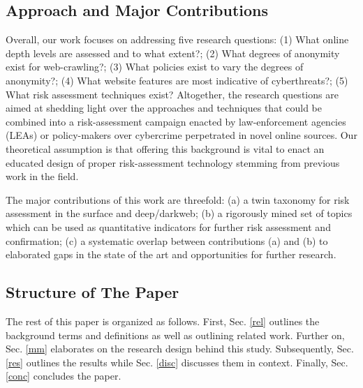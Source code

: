 \subsection{Approach and Major Contributions}
Overall, our work focuses on addressing five research questions: (1) What online depth levels are assessed and to what extent?; (2) What degrees of anonymity exist for web-crawling?; (3) What policies exist to vary the degrees of anonymity?; (4) What website features are most indicative of cyberthreats?; (5) What risk assessment techniques exist? Altogether, the research questions are aimed at shedding light over the approaches and techniques that could be combined into a risk-assessment campaign enacted by law-enforcement agencies (LEAs) or policy-makers over cybercrime perpetrated in novel online sources. Our theoretical assumption is that offering this background is vital to enact an educated design of proper risk-assessment technology stemming from previous work in the field.

The major contributions of this work are threefold: (a) a twin taxonomy for risk assessment in the surface and deep/darkweb; (b) a rigorously mined set of topics which can be used as quantitative indicators for  further risk assessment and confirmation; (c) a systematic overlap between contributions (a) and (b) to elaborated gaps in the state of the art and opportunities for further research.

\subsection{Structure of The Paper}

The rest of this paper is organized as follows. First, Sec. \ref{rel} outlines the background terms and definitions as well as outlining related work. Further on, Sec. \ref{mm} elaborates on the research design behind this study. Subsequently, Sec. \ref{res} outlines the results while Sec. \ref{disc} discusses them in context. Finally, Sec. \ref{conc} concludes the paper.


